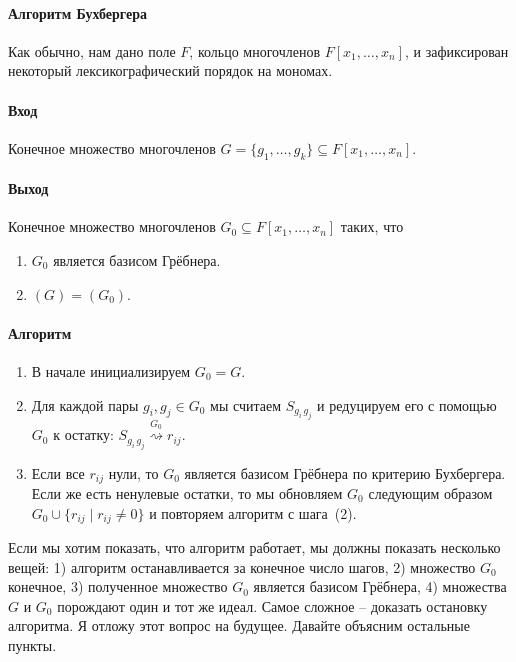 \paragraph{Алгоритм Бухбергера}

Как обычно, нам дано поле $F$, кольцо многочленов $F[x_1,\ldots,x_n]$, и зафиксирован некоторый лексикографический порядок на мономах.

\paragraph{Вход}

Конечное множество многочленов $G = \{g_1,\ldots,g_k\}\subseteq F[x_1,\ldots,x_n]$.

\paragraph{Выход}

Конечное множество многочленов $G_0\subseteq F[x_1,\ldots,x_n]$ таких, что
\begin{enumerate}
\item $G_0$ является базисом Грёбнера.

\item $(G) = (G_0)$.
\end{enumerate}

\paragraph{Алгоритм}

\begin{enumerate}
\item В начале инициализируем $G_0 = G$.

\item Для каждой пары $g_i,g_j\in G_0$ мы считаем $S_{g_i\,g_j}$ и редуцируем его с помощью $G_0$ к остатку: $S_{g_i\,g_j}\stackrel{G_0}{\rightsquigarrow}r_{ij}$.

\item Если все $r_{ij}$ нули, то $G_0$ является базисом Грёбнера по критерию Бухбергера.
Если же есть ненулевые остатки, то мы обновляем $G_0$ следующим образом $G_0\cup \{r_{ij}\mid r_{ij} \neq 0\}$ и повторяем алгоритм с шага~(2).
\end{enumerate}

Если мы хотим показать, что алгоритм работает, мы должны показать несколько вещей: 1) алгоритм останавливается за конечное число шагов, 2) множество $G_0$ конечное, 3) полученное множество $G_0$ является базисом Грёбнера, 4) множества $G$ и $G_0$ порождают один и тот же идеал.
Самое сложное -- доказать остановку алгоритма.
Я отложу этот вопрос на будущее.
Давайте объясним остальные пункты.

